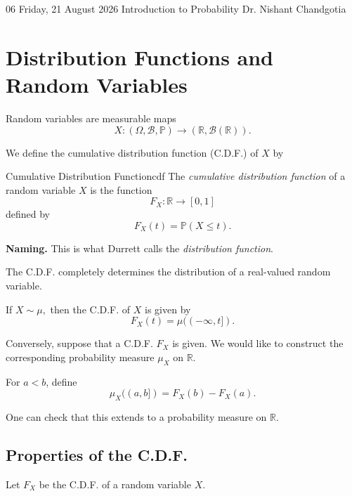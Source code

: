 
\lecture
{06}
{Friday, 21 August 2026}
{Introduction to Probability}
{Dr. Nishant Chandgotia}

\section{Distribution Functions and Random Variables}

Random variables are measurable maps
\[
X:
(\Omega,\mathcal{B},\mathbb{P})
\longrightarrow
(\mathbb{R},\mathcal{B}(\mathbb{R})).
\]

We define the cumulative distribution function (C.D.F.) of $X$ by

\begin{definition}{Cumulative Distribution Function}{cdf}
The \emph{cumulative distribution function} of a random variable
$X$ is the function
\[
F_X:\mathbb{R}\longrightarrow[0,1]
\]
defined by
\[
F_X(t)
=
\mathbb{P}(X\leq t).
\]
\end{definition}

\begin{remark}
\textbf{Naming.}
This is what Durrett calls the \emph{distribution function}.
\end{remark}

The C.D.F. completely determines the distribution of a real-valued
random variable.

If
\(
X\sim\mu,
\)
then the C.D.F. of $X$ is given by
\[
F_X(t)
=
\mu((-\infty,t]).
\]

Conversely, suppose that a C.D.F. $F_X$ is given. We would like to
construct the corresponding probability measure $\mu_X$ on
$\mathbb{R}$.

For $a<b$, define
\[
\mu_X((a,b])
=
F_X(b)-F_X(a).
\]

One can check that this extends to a probability measure on
$\mathbb{R}$.

\subsection{Properties of the C.D.F.}

Let $F_X$ be the C.D.F. of a random variable $X$.

